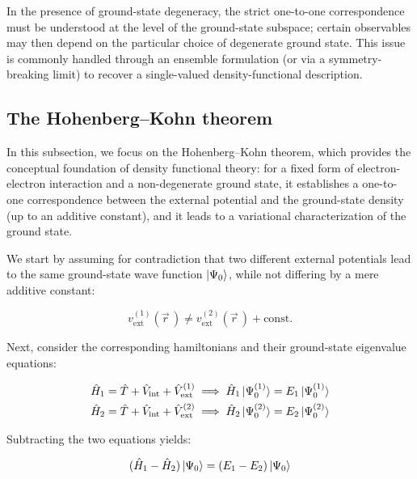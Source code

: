 In the presence of ground-state degeneracy, the strict one-to-one correspondence must be understood at the level of the ground-state subspace; certain observables may then depend on the particular choice of degenerate ground state. This issue is commonly handled through an ensemble formulation (or via a symmetry-breaking limit) to recover a single-valued density-functional description.

\FloatBarrier
\subsection{The Hohenberg--Kohn theorem}

In this subsection, we focus on the Hohenberg--Kohn theorem, which provides the conceptual foundation of density functional theory: for a fixed form of electron-electron interaction and a non-degenerate ground state, it establishes a one-to-one correspondence between the external potential and the ground-state density (up to an additive constant), and it leads to a variational characterization of the ground state.

We start by assuming for contradiction that two different external potentials lead to the same ground-state wave function $\ket{\Psi_0}$, while not differing by a mere additive constant:

\begin{equation}
    v^{(1)}_\mathrm{ext}(\vec{r}\,)\neq v^{(2)}_\mathrm{ext}(\vec{r}\,)+\mathrm{const.}
\label{V_ext}
\end{equation}

Next, consider the corresponding hamiltonians and their ground-state eigenvalue equations:

\begin{equation}
\begin{aligned}
    \hat{H}_1=\hat{T}+\hat{V}_\mathrm{int}+\hat{V}_\mathrm{ext}^{(1)} &\implies \hat{H}_1\ket{\Psi_0^{(1)}}=E_1\ket{\Psi_0^{(1)}} \\
    \hat{H}_2=\hat{T}+\hat{V}_\mathrm{int}+\hat{V}_\mathrm{ext}^{(2)} &\implies \hat{H}_2\ket{\Psi_0^{(2)}}=E_2\ket{\Psi_0^{(2)}}
\end{aligned}
\label{different_hamiltonians_schrodinger_equation}
\end{equation}

Subtracting the two equations yields:

\begin{equation}
    (\hat{H}_1-\hat{H}_2)\ket{\Psi_0}=(E_1-E_2)\ket{\Psi_0}
\label{difference_eigen}
\end{equation}

